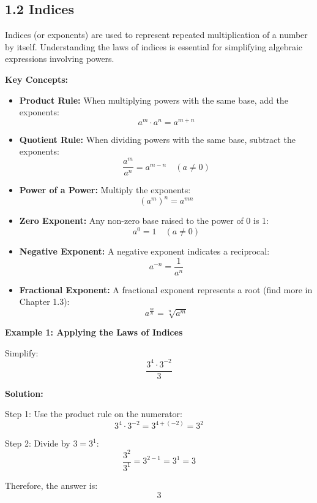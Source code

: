 
\subsection*{1.2 Indices}

Indices (or exponents) are used to represent repeated multiplication of a number by itself. Understanding the laws of indices is essential for simplifying algebraic expressions involving powers.

\textbf{Key Concepts:}

\begin{itemize}
    \item \textbf{Product Rule:} When multiplying powers with the same base, add the exponents:
    \[
    a^m \cdot a^n = a^{m+n}
    \]

    \item \textbf{Quotient Rule:} When dividing powers with the same base, subtract the exponents:
    \[
    \frac{a^m}{a^n} = a^{m-n} \quad (a \neq 0)
    \]

    \item \textbf{Power of a Power:} Multiply the exponents:
    \[
    (a^m)^n = a^{mn}
    \]

    \item \textbf{Zero Exponent:} Any non-zero base raised to the power of 0 is 1:
    \[
    a^0 = 1 \quad (a \neq 0)
    \]

    \item \textbf{Negative Exponent:} A negative exponent indicates a reciprocal:
    \[
    a^{-n} = \frac{1}{a^n}
    \]

    \item \textbf{Fractional Exponent:} A fractional exponent represents a root (find more in Chapter 1.3):
    \[
    a^{\frac{m}{n}} = \sqrt[n]{a^m}
    \]
\end{itemize}

\begin{flushleft}
\textbf{Example 1: Applying the Laws of Indices}

Simplify:  
\[
\frac{3^4 \cdot 3^{-2}}{3}
\]

\textbf{Solution:} \vspace{0.2cm}

Step 1: Use the product rule on the numerator:  
\[
3^4 \cdot 3^{-2} = 3^{4 + (-2)} = 3^2
\]

Step 2: Divide by \(3 = 3^1\):  
\[
\frac{3^2}{3^1} = 3^{2-1} = 3^1 = 3
\]

Therefore, the answer is:  
\[
3
\]
\end{flushleft}

